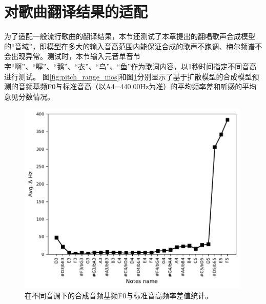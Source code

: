 \section{对歌曲翻译结果的适配}
为了适配一般流行歌曲的翻译结果，本节还测试了本章提出的翻唱歌声合成模型的``音域''，即模型在多大的输入音高范围内能保证合成的歌声不跑调、梅尔频谱不会出现异常。测试时，本节输入元音单音节字``啊''、``喔''、``鹅''、``衣''、``乌''、``鱼''作为歌词内容，以1秒时间指定不同音高进行测试。
图\ref{fig:pitch_range_mos}和图\ref{fig:pitch_range_delta}分别显示了基于扩散模型的合成模型预测的音频基频F0与标准音高（以A4=440.00Hz为准）的平均频率差和听感的平均意见分数情况。
\begin{figure}[!ht]
  \centering
	\includegraphics[width=0.99\textwidth]{figure/svs/pitch_range_delta.pdf}
	\caption{在不同音调下的合成音频基频F0与标准音高频率差值统计。}
\label{fig:pitch_range_delta}
\end{figure}
